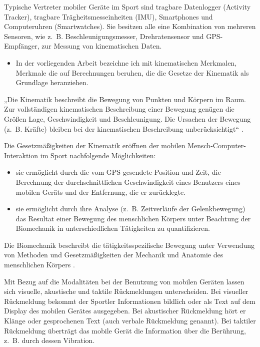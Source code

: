 Typische Vertreter mobiler Geräte im Sport sind tragbare Datenlogger (Activity Tracker), tragbare Trägheitsmesseinheiten (\ac{IMU}), Smartphones und Computeruhren (Smartwatches). Sie besitzen alle eine Kombination von mehreren Sensoren, wie z.~B. Beschleunigungsmesser, Drehratensensor und \acs{GPS}-Empfänger, zur Messung von kinematischen Daten. 
\begin{itemize}
	
	\item In der vorliegenden Arbeit bezeichne ich mit kinematischen Merkmalen, Merkmale die auf Berechnungen beruhen, die die Gesetze der Kinematik als Grundlage heranziehen.
\end{itemize}

„Die Kinematik beschreibt die Bewegung von Punkten und Körpern im Raum. Zur vollständigen kinematischen Beschreibung einer Bewegung genügen die Größen Lage, Geschwindigkeit und Beschleunigung. Die Ursachen der Bewegung (z.~B. Kräfte) bleiben bei der kinematischen Beschreibung unberücksichtigt“ \citep[][S.~57]{Disselhorst-Klug2015}.

Die Gesetzmäßigkeiten der Kinematik eröffnen der mobilen Mensch-Computer-Interaktion im Sport nachfolgende Möglichkeiten: 
\begin{itemize}
	\item sie ermöglicht durch die vom \acs{GPS} gesendete Position und Zeit, die Berechnung der durchschnittlichen Geschwindigkeit eines Benutzers eines mobilen Geräts und der Entfernung, die er zurücklegte. 
	\item sie ermöglicht durch ihre Analyse (z.~B. Zeitverläufe der Gelenkbewegung) das Resultat einer Bewegung des menschlichen Körpers unter Beachtung der Biomechanik in unterschiedlichen Tätigkeiten zu quantifizieren. 
\end{itemize}

Die Biomechanik beschreibt die tätigkeitsspezifische Bewegung unter Verwendung von Methoden und Gesetzmäßigkeiten der Mechanik und Anatomie des menschlichen Körpers \citep[][S.~2ff.]{Winter2009}.

Mit Bezug auf die Modalitäten bei der Benutzung von mobilen Geräten lassen sich visuelle, akustische und taktile Rückmeldungen unterscheiden. Bei visueller Rückmeldung bekommt der Sportler Informationen bildlich oder als Text auf dem Display des mobilen Gerätes ausgegeben. Bei akustischer Rückmeldung hört er Klänge oder gesprochenen Text (auch verbale Rückmeldung genannt). Bei taktiler Rückmeldung überträgt das mobile Gerät die Information über die Berührung, z.~B. durch dessen Vibration.

